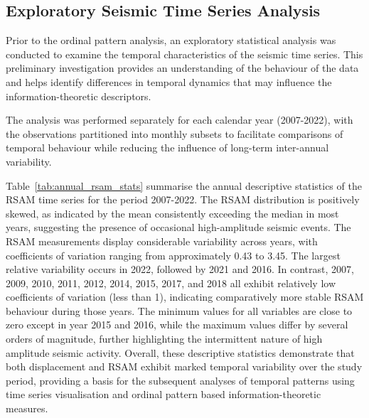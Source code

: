 \documentclass[12pt,a4paper]{article}
\begin{document}
\subsection{Exploratory Seismic Time Series Analysis}\label{exploratory_analysis}
Prior to the ordinal pattern analysis, an exploratory statistical analysis was conducted to examine the temporal characteristics of the seismic time series. This preliminary investigation provides an understanding of the behaviour of the data and helps identify differences in temporal dynamics that may influence the information-theoretic descriptors.

The analysis was performed separately for each calendar year (2007-2022), with the observations partitioned into monthly subsets to facilitate comparisons of temporal behaviour while reducing the influence of long-term inter-annual variability.

Table~\ref{tab:annual_rsam_stats} summarise the annual descriptive statistics of the RSAM time series for the period 2007-2022. 
The RSAM distribution is positively skewed, as indicated by the mean consistently exceeding the median in most years, suggesting the presence of occasional high-amplitude seismic events. The RSAM measurements display considerable variability across years, with coefficients of variation ranging from approximately 0.43 to 3.45. The largest relative variability occurs in 2022, followed by 2021 and 2016. In contrast, 2007, 2009, 2010, 2011, 2012, 2014, 2015, 2017, and 2018 all exhibit relatively low coefficients of variation (less than 1), indicating comparatively more stable RSAM behaviour during those years. The minimum values for all variables are close to zero except in year 2015 and 2016, while the maximum values differ by several orders of magnitude, further highlighting the intermittent nature of high amplitude seismic activity. Overall, these descriptive statistics demonstrate that both displacement and RSAM exhibit marked temporal variability over the study period, providing a basis for the subsequent analyses of temporal patterns using time series visualisation and ordinal pattern based information-theoretic measures.
\end{document}
